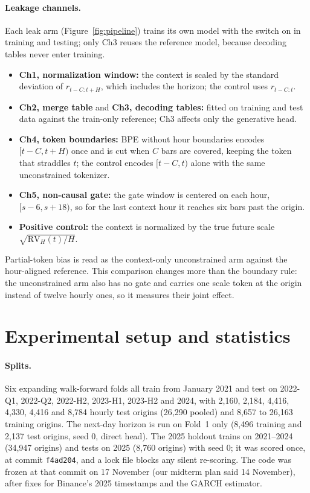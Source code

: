 \documentclass{article}
\begin{document}
\paragraph{Leakage channels.}
Each leak arm (Figure~\ref{fig:pipeline}) trains its own model with the switch on in training and
testing; only Ch3 reuses the reference model, because decoding tables never enter training.
\begin{itemize}
  \item \textbf{Ch1, normalization window:} the context is scaled by the standard deviation of
        $r_{t-C:t+H}$, which includes the horizon; the control uses $r_{t-C:t}$.
  \item \textbf{Ch2, merge table} and \textbf{Ch3, decoding tables:} fitted on training and test
        data against the train-only reference; Ch3 affects only the generative head.
  \item \textbf{Ch4, token boundaries:} BPE without hour boundaries encodes $[t-C, t+H)$ once and is
        cut when $C$ bars are covered, keeping the token that straddles $t$; the control encodes
        $[t-C, t)$ alone with the same unconstrained tokenizer.
  \item \textbf{Ch5, non-causal gate:} the gate window is centered on each hour, $[s-6, s+18)$, so
        for the last context hour it reaches six bars past the origin.
  \item \textbf{Positive control:} the context is normalized by the true future scale
        $\sqrt{\mathrm{RV}_H(t)/H}$.
\end{itemize}
Partial-token bias is read as the context-only unconstrained arm against the hour-aligned
reference. This comparison changes more than the boundary rule: the unconstrained arm also has no
gate and carries one scale token at the origin instead of twelve hourly ones, so it measures their
joint effect.

\section{Experimental setup and statistics}

\paragraph{Splits.}
Six expanding walk-forward folds all train from January 2021 and test on 2022-Q1, 2022-Q2, 2022-H2,
2023-H1, 2023-H2 and 2024, with 2,160, 2,184, 4,416, 4,330, 4,416 and 8,784 hourly test origins
(26,290 pooled) and 8,657 to 26,163 training origins. The next-day horizon is run on Fold~1 only
(8,496 training and 2,137 test origins, seed 0, direct head). The 2025 holdout trains on 2021--2024
(34,947 origins) and tests on 2025 (8,760 origins) with seed 0; it was scored once, at commit
\texttt{f4ad204}, and a lock file blocks any silent re-scoring. The code was frozen at that commit on
17 November (our midterm plan said 14 November), after fixes for Binance's 2025 timestamps and the
GARCH estimator.
\end{document}
